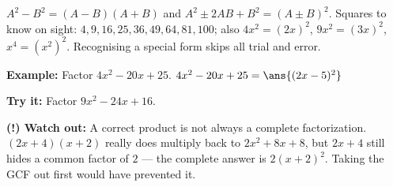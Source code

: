 \documentclass[12pt]{article}
\begin{document}
\begin{formulabox}
$A^2 - B^2 = (A - B)(A + B)$ and $A^2 \pm 2AB + B^2 = (A \pm B)^2$. Squares to
know on sight: $4, 9, 16, 25, 36, 49, 64, 81, 100$; also $4x^2 = (2x)^2$,
$9x^2 = (3x)^2$, $x^4 = (x^2)^2$. Recognising a special form skips all trial
and error.
\end{formulabox}

\begin{examplebox}
\textbf{Example:} Factor $4x^2 - 20x + 25$.
$4x^2 - 20x + 25 = \ans{(2x-5)^2}$
\end{examplebox}

\begin{tryitbox}
\textbf{Try it:} Factor $9x^2 - 24x + 16$.\\[2pt]
\end{tryitbox}

\begin{watchoutbox}
\textbf{(!) Watch out:} A correct product is not always a complete
factorization. $(2x + 4)(x + 2)$ really does multiply back to $2x^2 + 8x + 8$,
but $2x + 4$ still hides a common factor of $2$ --- the complete answer is
$2(x + 2)^2$. Taking the GCF out first would have prevented it.
\end{watchoutbox}
\end{document}
